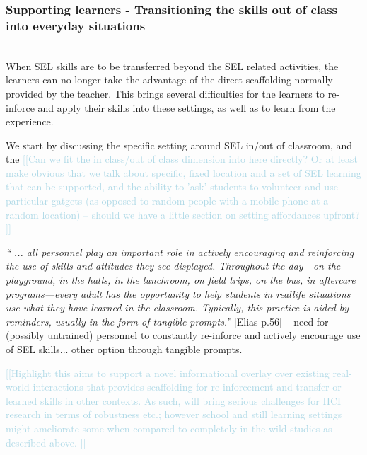 \documentclass[prodmode,acmtochi]{acmsmall}
\newcommand{\todo}[1]{\textrm{\textrm{\textcolor{LightBlue}{[[#1]]} } } }
\newcommand{\qq}[2]{\textrm{\textit{``#2''}}{ [#1]}}
\begin{document}
\subsubsection{Supporting learners - Transitioning the skills out of class into everyday situations}
\label{sec:Embedding-learners} ~ \\
When SEL skills are to be transferred beyond the SEL related activities, the learners can no longer take the advantage of the direct scaffolding normally provided by the teacher. This brings several difficulties for the learners to re-inforce and apply their skills into these settings, as well as to learn from the experience. 

We start by discussing the specific setting around SEL in/out of classroom, and the  \todo{Can we fit the in class/out of class dimension into here directly? Or at least make obvious that we talk about specific, fixed location and a set of SEL learning that can be supported, and the ability to 'ask' students to volunteer and use particular gatgets (as opposed to random people with a mobile phone at a random location) -- should we have a little section on setting affordances upfront? }

\qq{Elias p.56}{ ... all personnel play an important role in actively encouraging and reinforcing the use of skills and attitudes they see displayed. Throughout the day—on the playground, in the halls, in the lunchroom, on field trips, on the bus, in aftercare programs—every adult has the opportunity to help students in reallife situations use what they have learned in the classroom. Typically, this practice is aided by reminders, usually in the form of tangible prompts.} -- need for (possibly untrained) personnel to constantly re-inforce and actively encourage use of SEL skills... other option through tangible prompts. 

\todo{Highlight this aims to support a novel informational overlay over existing real-world interactions that provides scaffolding for re-inforcement and transfer or learned skills in other contexts. As such, will bring serious challenges for HCI research in terms of robustness etc.; however school and still learning settings might ameliorate some when compared to completely in the wild studies as described above. }
\end{document}
